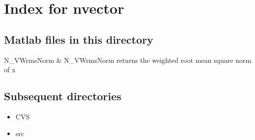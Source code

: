 \section{Index for {\sc nvector}}

\subsection{Matlab files in this directory}

\begin{tabular}

N_VWrmsNorm & N_VWrmsNorm returns the weighted root mean square norm of x  \\
\end{tabular}


\subsection{Subsequent directories}

\begin{itemize}


\item CVS
\item src
\end{itemize}